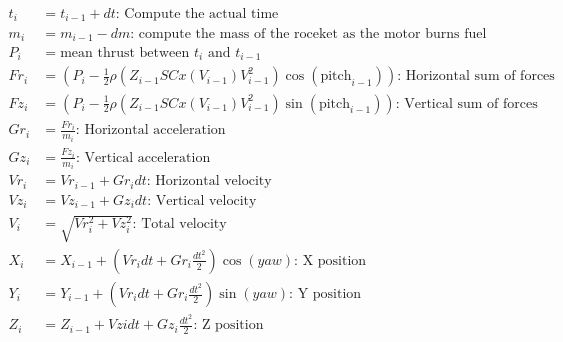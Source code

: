 \begin{minipage}[c]{1\textwidth}
    \centering
    \begin{align*}
        t_i  & = t_{i-1} + dt \text{: Compute the actual time}                                                                      \\
        m_i  & = m_{i-1} - dm \text{: compute the mass of the roceket as the motor burns fuel}                                      \\
        P_i  & = \text{mean thrust between $t_i$ and $t_{i-1}$}                                                                     \\
        Fr_i & = (P_i - \frac{1}{2}\rho(Z_{i-1}SCx(V_{i-1})V^2_{i-1}) \cos({\text{pitch}_{i-1}})) \text{: Horizontal sum of forces} \\
        Fz_i & = (P_i - \frac{1}{2}\rho(Z_{i-1}SCx(V_{i-1})V^2_{i-1}) \sin({\text{pitch}_{i-1}})) \text{: Vertical sum of forces}   \\
        Gr_i & = \frac{Fr_i}{m_i} \text{: Horizontal acceleration}                                                                  \\
        Gz_i & = \frac{Fz_i}{m_i} \text{: Vertical acceleration}                                                                    \\
        Vr_i & = Vr_{i-1} + Gr_i dt \text{: Horizontal velocity}                                                                    \\
        Vz_i & = Vz_{i-1} + Gz_i dt \text{: Vertical velocity}                                                                      \\
        V_i  & = \sqrt{Vr_i^2 + Vz_i^2} \text{: Total velocity}                                                                     \\
        X_i  & = X_{i-1} + (Vr_i dt + Gr_i \frac{dt^2}{2}) \cos({yaw})\text{: X position}                                           \\
        Y_i  & = Y_{i-1} + (Vr_i dt + Gr_i \frac{dt^2}{2}) \sin({yaw}) \text{: Y position}                                          \\
        Z_i  & = Z_{i-1} + Vzi dt + Gz_i \frac{dt^2}{2} \text{: Z position}                                                         \\
    \end{align*}
\end{minipage}


